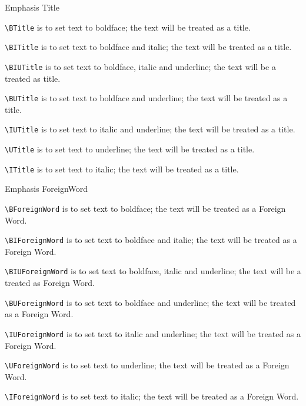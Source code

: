 \documentclass[12pt,Bold,letterpaper,TexShade]{mcgilletdclass}
\begin{document}
\begin{BulletList}
		\item{Emphasis Title}
		\begin{romanList}
			\item{ \verb=\BTitle= is to set text to boldface; the text will be treated as a title}.
			\item{ \verb=\BITitle= is to set text to boldface and italic; the text will be treated as a title}.
			\item{ \verb=\BIUTitle= is to set text to boldface, italic and underline; the text will be a treated as title}.
			\item{ \verb=\BUTitle= is to set text to boldface and underline; the text will be treated as a title}.
			\item{ \verb=\IUTitle= is to set text to italic and underline; the text will be treated as a title}.
			\item{ \verb=\UTitle= is to set text to underline; the text will be treated as a title}.
			\item{ \verb=\ITitle= is to set text to italic; the text will be treated as a title}.
		\end{romanList}

		\item{Emphasis ForeignWord}
		\begin{romanList}
			\item{ \verb=\BForeignWord= is to set text to boldface; the text will be treated as a Foreign Word}.
			\item{ \verb=\BIForeignWord= is to set text to boldface and italic; the text will be treated as a Foreign Word}.
			\item{ \verb=\BIUForeignWord= is to set text to boldface, italic and underline; the text will be a treated as Foreign Word}.
			\item{ \verb=\BUForeignWord= is to set text to boldface and underline; the text will be treated as a Foreign Word}.
			\item{ \verb=\IUForeignWord= is to set text to italic and underline; the text will be treated as a Foreign Word}.
			\item{ \verb=\UForeignWord= is to set text to underline; the text will be treated as a Foreign Word}.
			\item{ \verb=\IForeignWord= is to set text to italic; the text will be treated as a Foreign Word}.
		\end{romanList}


\end{BulletList}
\end{document}
